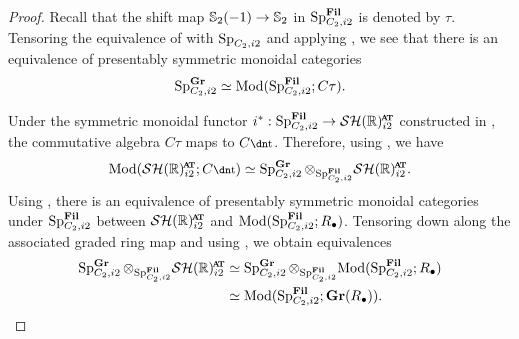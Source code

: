 \begin{proof}
  Recall that the shift map $\operatorname{\mathbb{S}}_2(-1) \to \operatorname{\mathbb{S}}_2$ in $\operatorname{\mathrm{Sp}}_{C_2, i2}^{\operatorname{\mathbf{Fil}}}$ is denoted by $\tau$.
    Tensoring the equivalence of  with $\operatorname{\mathrm{Sp}}_{C_2, i2}$ and applying , we see that there is an equivalence of presentably symmetric monoidal categories
    \[ \operatorname{\mathrm{Sp}}_{C_2, i2} ^{\operatorname{\mathbf{Gr}}} \simeq \mathrm{Mod} ( \operatorname{\mathrm{Sp}}_{C_2, i2} ^{\operatorname{\mathbf{Fil}}} ; C\tau ). \]

    Under the symmetric monoidal functor $i^* : \Sp_{C_2, i2} ^{\Fil} \to \SHRat$ constructed in , the commutative algebra $C\tau$ maps to $C\ta$. Therefore, using , we have 
    \[ \mathrm{Mod}(\SHRat; C\ta) \simeq \Sp_{C_2, i2}^{\Gr} \otimes_{\Sp_{C_2, i2} ^{\Fil}} \SHRat. \]
    Using , there is an equivalence of presentably symmetric monoidal categories under $\operatorname{\mathrm{Sp}}_{C_2, i2}^{\operatorname{\mathbf{Fil}}}$ between $\SHRat$ and $\mathrm{Mod}( \operatorname{\mathrm{Sp}}^{\operatorname{\mathbf{Fil}}}_{C_2,i2} ; R_\bullet )$. Tensoring down along the associated graded ring map and using , we obtain equivalences
    \begin{align*}
      \Sp_{C_2, i2}^{\Gr} \otimes_{\Sp_{C_2, i2}^{\Fil}} \SHRat
      &\simeq \Sp_{C_2,i2}^{\Gr} \otimes_{\Sp_{C_2,i2}^{\Fil}} \mathrm{Mod}( \Sp_{C_2,i2}^{\Fil} ; R_\bullet ) \\
      &\simeq \mathrm{Mod}( \Sp_{C_2,i2}^{\Fil} ; \Gr(R_{\bullet}) ). \qedhere
    \end{align*}

  
\end{proof}

